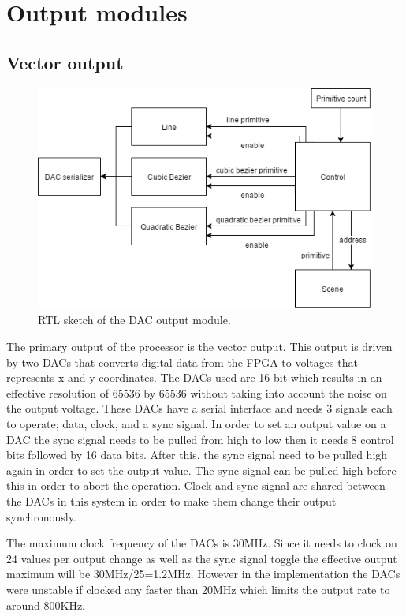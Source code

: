 \chapter{Output modules}
\label{chap:Output}

\section{Vector output}

\begin{figure}[h!]
    \includegraphics[width=\linewidth]{images/dac-output.png}
    \caption{RTL sketch of the \vthreek DAC output module.}
    \label{fig:dac-output}
\end{figure}

The primary output of the processor is the vector output.
This output is driven by two DACs that converts digital data from the FPGA to voltages that represents x and y coordinates.
The DACs used are 16-bit which results in an effective resolution of 65536 by 65536 without taking into account the noise on the output voltage.
These DACs have a serial interface and needs 3 signals each to operate; data, clock, and a sync signal.
In order to set an output value on a DAC the sync signal needs to be pulled from high to low then it needs 8 control bits followed by 16 data bits.
After this, the sync signal need to be pulled high again in order to set the output value.
The sync signal can be pulled high before this in order to abort the operation.
Clock and sync signal are shared between the DACs in this system in order to make them change their output synchronously.

The maximum clock frequency of the DACs is 30MHz. 
Since it needs to clock on 24 values per output change as well as the sync signal toggle the effective output maximum will be 30MHz/25=1.2MHz.
However in the implementation the DACs were unstable if clocked any faster than 20MHz which limits the output rate to around 800KHz.

